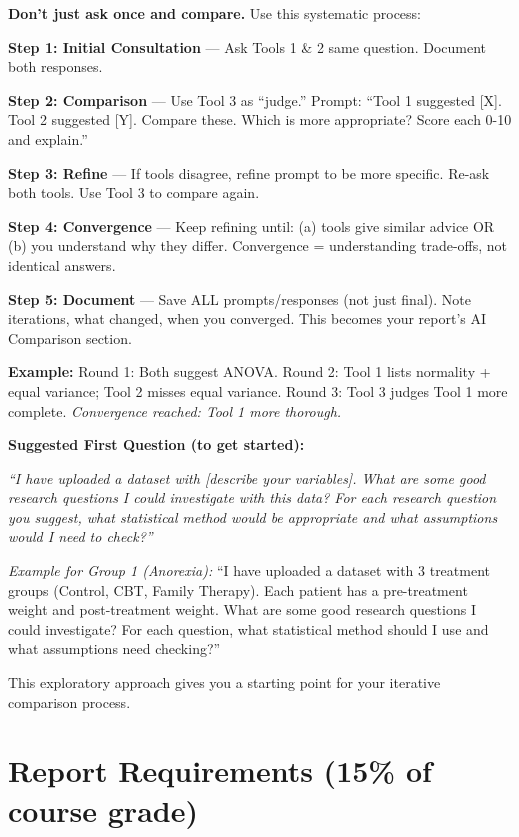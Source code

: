 \documentclass[9pt]{article}
\begin{document}
\textbf{Don't just ask once and compare.} Use this systematic process:

\textbf{Step 1: Initial Consultation} — Ask Tools 1 \& 2 same question. Document both responses.

\textbf{Step 2: Comparison} — Use Tool 3 as ``judge.'' Prompt: ``Tool 1 suggested [X]. Tool 2 suggested [Y]. Compare these. Which is more appropriate? Score each 0-10 and explain.''

\textbf{Step 3: Refine} — If tools disagree, refine prompt to be more specific. Re-ask both tools. Use Tool 3 to compare again.

\textbf{Step 4: Convergence} — Keep refining until: (a) tools give similar advice OR (b) you understand why they differ. Convergence = understanding trade-offs, not identical answers.

\textbf{Step 5: Document} — Save ALL prompts/responses (not just final). Note iterations, what changed, when you converged. This becomes your report's AI Comparison section.

\textbf{Example:} Round 1: Both suggest ANOVA. Round 2: Tool 1 lists normality + equal variance; Tool 2 misses equal variance. Round 3: Tool 3 judges Tool 1 more complete. \textit{Convergence reached: Tool 1 more thorough.}

\vspace{2pt}

\textbf{Suggested First Question (to get started):}

\textit{``I have uploaded a dataset with [describe your variables]. What are some good research questions I could investigate with this data? For each research question you suggest, what statistical method would be appropriate and what assumptions would I need to check?''}

\textit{Example for Group 1 (Anorexia):} ``I have uploaded a dataset with 3 treatment groups (Control, CBT, Family Therapy). Each patient has a pre-treatment weight and post-treatment weight. What are some good research questions I could investigate? For each question, what statistical method should I use and what assumptions need checking?''

This exploratory approach gives you a starting point for your iterative comparison process.

\newpage

\section*{Report Requirements (15\% of course grade)}
\end{document}
